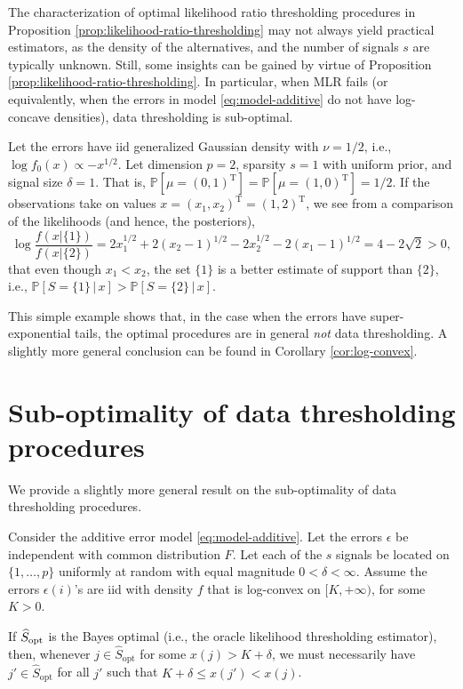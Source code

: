The characterization of optimal likelihood ratio thresholding procedures in Proposition \ref{prop:likelihood-ratio-thresholding} may not always yield practical estimators, as the density of the alternatives, and the number of signals $s$ 
are typically unknown. Still, some insights can be gained by virtue of Proposition \ref{prop:likelihood-ratio-thresholding}.
In particular, when MLR fails (or equivalently, when the errors in model \eqref{eq:model-additive} do not have log-concave densities), data thresholding is sub-optimal. 


\begin{example} \label{exmp:suboptimal-data-thresholding}
Let the errors have iid generalized Gaussian density with $\nu=1/2$, i.e., $\log{f_0(x)}\propto -x^{1/2}$. 
Let dimension $p=2$, sparsity $s=1$ with uniform prior, and signal size $\delta=1$.
That is, $\mathbb P[\mu = (0,1)^\mathrm{T}] = \mathbb P[\mu = (1,0)^\mathrm{T}] = 1/2$.
If the observations take on values $x = (x_1, x_2)^\mathrm{T} = (1,2)^\mathrm{T}$, we see from a comparison of the likelihoods (and hence, the posteriors),
$$
\log \frac{f(x|\{1\})}{f(x|\{2\})} = 2x_1^{1/2} + 2(x_2 - 1)^{1/2} - 2x_2^{1/2} - 2(x_1 - 1)^{1/2} = 4 - 2\sqrt{2} > 0,
$$
that even though $x_1<x_2$, the set $\{1\}$ is a better estimate of support than $\{2\}$, i.e., $\mathbb P[S=\{1\}\,\big|\,x] > \mathbb P[S=\{2\}\,\big|\,x]$.
\end{example}

This simple example shows that, in the case when the errors have super-exponential tails, the optimal procedures are in general \emph{not} data thresholding.
A slightly more general conclusion can be found in Corollary \ref{cor:log-convex}.

\section{Sub-optimality of data thresholding procedures}\label{sec:sup-optimality-of-thresholding}

We provide a slightly more general result on the sub-optimality of data thresholding procedures.

\begin{corollary} \label{cor:log-convex}
Consider the additive error model \eqref{eq:model-additive}.
Let the errors $\epsilon$ be independent with common distribution $F$.
Let each of the $s$ signals be located on $\{1,\ldots,p\}$ uniformly at random with equal magnitude $0<\delta<\infty$.
Assume the errors $\epsilon(i)$'s are iid with density $f$ that is log-convex on $[K, +\infty)$, for some $K>0$. 

If $\widehat{S}_{\rm opt}$ is the Bayes optimal (i.e., the oracle likelihood thresholding estimator), then, whenever 
$j\in\widehat{S}_{\text{opt}}$ for some $x(j) > K+\delta$, we must necessarily have $j'\in\widehat{S}_{\text{opt}}$ for 
all $j'$ such that $K+\delta \le x(j') < x(j)$.
\end{corollary} 

